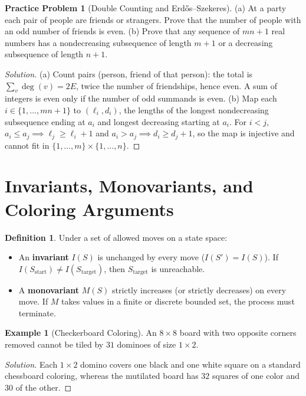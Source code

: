 \documentclass[11pt]{article}
\theoremstyle{plain}
\theoremstyle{definition}
\newtheorem{definition}[theorem]{Definition}
\newtheorem{example}[theorem]{Example}
\newtheorem{problem}[theorem]{Practice Problem}
\newenvironment{solution}{\begin{proof}[Solution]}{\end{proof}}
\begin{document}
\begin{problem}[Double Counting and Erdős--Szekeres]
(a) At a party each pair of people are friends or strangers. Prove that the number
of people with an odd number of friends is even.
(b) Prove that any sequence of $mn+1$ real numbers has a nondecreasing subsequence of length $m+1$ or a decreasing subsequence of length $n+1$.
\end{problem}
\begin{solution}
(a) Count pairs (person, friend of that person): the total is
$\sum_v \deg(v) = 2E$, twice the number of friendships, hence even. A sum of
integers is even only if the number of odd summands is even.
(b) Map each $i \in \{1,\dots,mn+1\}$ to $(\ell_i, d_i)$, the lengths of the longest nondecreasing subsequence ending at $a_i$ and longest decreasing starting at $a_i$. For $i < j$, $a_i \le a_j \implies \ell_j \ge \ell_i+1$ and $a_i > a_j \implies d_i \ge d_j+1$, so the map is injective and cannot fit in $\{1,\dots,m\}\times\{1,\dots,n\}$.
\end{solution}

\section{Invariants, Monovariants, and Coloring Arguments}

\begin{definition}
Under a set of allowed moves on a state space:
\begin{itemize}
\item An \textbf{invariant} $I(S)$ is unchanged by every move ($I(S')=I(S)$). If $I(S_{\text{start}}) \ne I(S_{\text{target}})$, then $S_{\text{target}}$ is unreachable.
\item A \textbf{monovariant} $M(S)$ strictly increases (or strictly decreases) on every move. If $M$ takes values in a finite or discrete bounded set, the process must terminate.
\end{itemize}
\end{definition}

\begin{example}[Checkerboard Coloring]
An $8 \times 8$ board with two opposite corners removed cannot be tiled by $31$ dominoes of size $1 \times 2$.
\end{example}
\begin{solution}
Each $1 \times 2$ domino covers one black and one white square on a standard chessboard coloring, whereas the mutilated board has $32$ squares of one color and $30$ of the other.
\end{solution}
\end{document}
